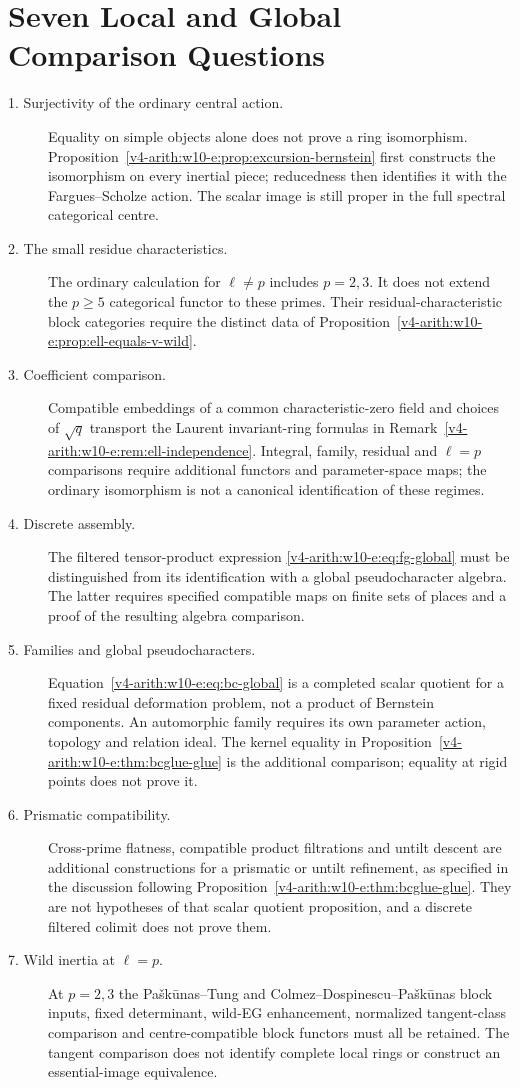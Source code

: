 \section{Seven Local and Global Comparison Questions}
\label{v4-arith:w10-e:seven-obstruction}
\begin{description}
\item[1. Surjectivity of the ordinary central action.]
Equality on simple objects alone does not prove a ring isomorphism.
Proposition~\ref{v4-arith:w10-e:prop:excursion-bernstein} first constructs the
isomorphism on every inertial piece; reducedness then identifies it
with the Fargues--Scholze action. The scalar image is still proper in
the full spectral categorical centre.
\item[2. The small residue characteristics.]
The ordinary calculation for $\ell\neq p$ includes $p=2,3$.
It does not extend the $p\geq5$ categorical functor to these primes.
Their residual-characteristic block categories require the distinct
data of Proposition~\ref{v4-arith:w10-e:prop:ell-equals-v-wild}.
\item[3. Coefficient comparison.]
Compatible embeddings of a common characteristic-zero field and
choices of $\sqrt q$ transport the Laurent invariant-ring formulas
in Remark~\ref{v4-arith:w10-e:rem:ell-independence}. Integral, family,
residual and $\ell=p$ comparisons require additional functors and
parameter-space maps; the ordinary isomorphism is not a canonical
identification of these regimes.
\item[4. Discrete assembly.]
The filtered tensor-product expression
\eqref{v4-arith:w10-e:eq:fg-global} must be distinguished from its
identification with a global pseudocharacter algebra. The latter
requires specified compatible maps on finite sets of places and
a proof of the resulting algebra comparison.
\item[5. Families and global pseudocharacters.]
Equation~\eqref{v4-arith:w10-e:eq:bc-global} is a completed scalar
quotient for a fixed residual deformation problem, not a product of
Bernstein components. An automorphic family requires its own parameter
action, topology and relation ideal. The kernel equality in
Proposition~\ref{v4-arith:w10-e:thm:bcglue-glue} is the additional
comparison; equality at rigid points does not prove it.
\item[6. Prismatic compatibility.]
Cross-prime flatness, compatible product filtrations and untilt
descent are additional constructions for a prismatic or untilt
refinement, as specified in the discussion following
Proposition~\ref{v4-arith:w10-e:thm:bcglue-glue}. They are not
hypotheses of that scalar quotient proposition, and a discrete
filtered colimit does not prove them.
\item[7. Wild inertia at $\ell=p$.]
At $p=2,3$ the Pa{\v s}k{\=u}nas--Tung and
Colmez--Dospinescu--Pa{\v s}k{\=u}nas block inputs, fixed determinant,
wild-EG enhancement, normalized tangent-class comparison and
centre-compatible block functors must all be retained. The tangent
comparison does not identify complete local rings or construct
an essential-image equivalence.
\end{description}

